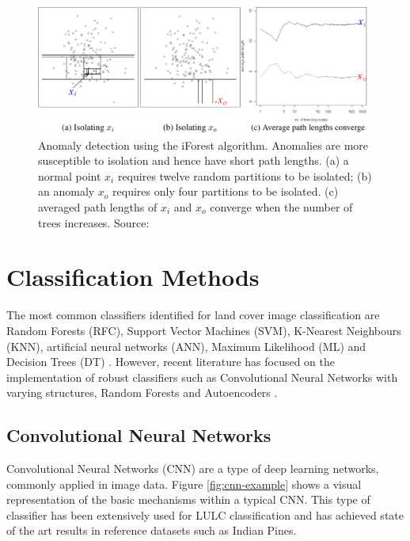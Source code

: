 \documentclass[12pt, english, openany]{book}
\begin{document}
\begin{figure}[H]
  \centering
  \includegraphics[width=1\linewidth]{iforest_demo.png}
  \caption[Anomaly detection using the iForest algorithm.]{Anomaly detection using the iForest algorithm. Anomalies are more susceptible
    to isolation and hence have short path lengths. (a) a normal point
    $x_i$ requires twelve random partitions to be isolated; (b) an
    anomaly $x_o$ requires only four partitions to be isolated. (c)
    averaged path lengths of $x_i$ and $x_o$
    converge when the number of trees increases. Source: \cite{Liu2008}}
  \label{fig:iforest-demonstration}
\end{figure}

\section{Classification Methods}

The most common classifiers identified for land cover image classification are
Random Forests (RFC), Support Vector Machines (SVM), K-Nearest Neighbours
(KNN), artificial neural networks (ANN), Maximum Likelihood (ML) and Decision
Trees (DT) \cite{Khatami2016, Maxwell2018}. However, recent literature has focused on
the implementation of robust classifiers such as Convolutional Neural Networks
with varying structures, Random Forests and Autoencoders
\cite{Roy2019, Zhang2017, Li2016}.

\subsection*{Convolutional Neural Networks}

Convolutional Neural Networks (CNN) are a type of deep learning networks,
commonly applied in image data. Figure \ref{fig:cnn-example} shows a visual
representation of the basic mechanisms within a typical CNN. This type of
classifier has been extensively used for LULC classification and has achieved
state of the art results in reference datasets such as Indian Pines.
\end{document}
